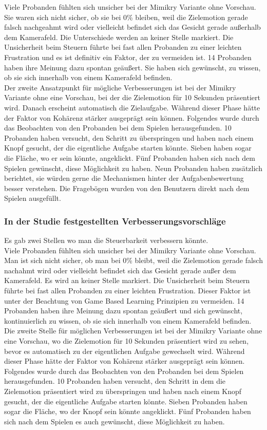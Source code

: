 Viele Probanden fühlten sich unsicher bei der Mimikry Variante ohne Vorschau. Sie waren sich nicht sicher, ob sie bei 0\% bleiben, weil die Zielemotion gerade falsch nachgeahmt wird oder vielleicht befindet sich das Gesicht gerade außerhalb dem Kamerafeld. Die Unterschiede werden an keiner Stelle markiert. 
Die Unsicherheit beim Steuern führte bei fast allen Probanden zu einer leichten Frustration und es ist definitiv ein Faktor, der zu vermeiden ist. 14 Probanden haben ihre Meinung dazu spontan geäußert. Sie haben sich gewünscht, zu wissen, ob sie sich innerhalb von einem Kamerafeld befinden.\\
Der zweite Ansatzpunkt für mögliche Verbesserungen ist bei der Mimikry Variante ohne eine Vorschau, bei der die Zielemotion für 10 Sekunden präsentiert wird. Danach erscheint automatisch die Zielaufgabe. Während dieser Phase hätte der Faktor von Kohärenz stärker ausgeprägt sein können. 
Folgendes wurde durch das Beobachten von den Probanden bei dem Spielen herausgefunden.
10 Probanden haben versucht, den Schritt zu überspringen und haben nach einem Knopf gesucht, der die eigentliche Aufgabe starten könnte. Sieben haben sogar die Fläche, wo er sein könnte, angeklickt. Fünf Probanden haben sich nach dem Spielen gewünscht, diese Möglichkeit zu haben. Neun Probanden haben zusätzlich berichtet, sie würden gerne die Mechanismen hinter der Aufgabenbewertung besser verstehen. 
Die Fragebögen wurden von den Benutzern direkt nach dem Spielen ausgefüllt.

\subsubsection{In der Studie festgestellten Verbesserungsvorschläge}
Es gab zwei Stellen wo man die Steuerbarkeit verbessern könnte. \\
Viele Probanden fühlten sich unsicher bei der Mimikry Variante ohne Vorschau. Man ist sich nicht sicher, ob man bei 0\% bleibt, weil die Zielemotion gerade falsch nachahmt wird oder vielleicht befindet sich das Gesicht gerade außer dem Kamerafeld. Es wird an keiner Stelle markiert. 
Die Unsicherheit beim Steuern führte bei fast allen Probanden zu einer leichten Frustration. Dieser Faktor ist unter der Beachtung von Game Based Learning Prinzipien zu vermeiden. 14 Probanden haben ihre Meinung dazu spontan geäußert und sich gewünscht, kontinuierlich zu wissen, ob sie sich innerhalb von einem Kamerafeld befinden.\\
Die zweite Stelle für möglichen Verbesserungen ist bei der Mimikry Variante ohne eine Vorschau, wo die Zielemotion für 10 Sekunden präsentiert wird zu sehen, bevor es automatisch zu der eigentlichen Aufgabe gewechselt wird. Während dieser Phase hätte der Faktor von Kohärenz stärker ausgeprägt sein können. Folgendes wurde durch das Beobachten von den Probanden bei dem Spielen herausgefunden. 10 Probanden haben versucht, den Schritt in dem die Zielemotion präsentiert wird zu überspringen und haben nach einem Knopf gesucht, der die eigentliche Aufgabe starten könnte. Sieben Probanden haben sogar die Fläche, wo der Knopf sein könnte angeklickt. Fünf Probanden haben sich nach dem Spielen es auch gewünscht, diese Möglichkeit zu haben.

